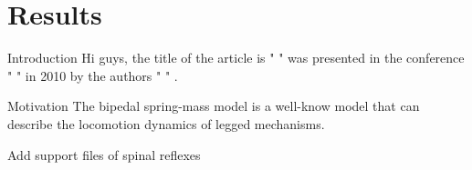 \documentclass[10pt]{beamer}
\begin{document}





\section{Results}


\begin{frame}
	\begin{exampleblock}{Introduction}
		Hi guys, the title of the article is "  " was presented in the conference " " in 2010 by the authors "  " .
	\end{exampleblock}
	\begin{exampleblock}{Motivation}
		The bipedal spring-mass model is a well-know model that can describe the locomotion  dynamics of legged mechanisms.
	\end{exampleblock}
	\begin{exampleblock}
		Add support files of spinal reflexes
	\end{exampleblock}
\end{frame}
\end{document}
